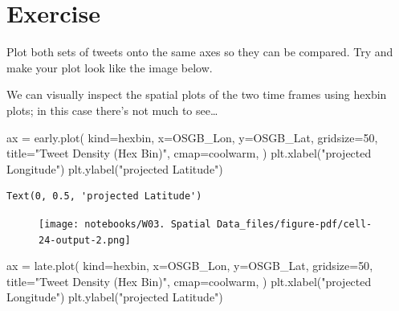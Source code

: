 \documentclass[
  letterpaper,
  DIV=11,
  numbers=noendperiod]{scrreprt}
\newenvironment{Shaded}{\begin{snugshade}}{\end{snugshade}}
\newcommand{\DecValTok}[1]{\textcolor[rgb]{0.68,0.00,0.00}{#1}}
\newcommand{\NormalTok}[1]{\textcolor[rgb]{0.00,0.23,0.31}{#1}}
\newcommand{\OperatorTok}[1]{\textcolor[rgb]{0.37,0.37,0.37}{#1}}
\newcommand{\StringTok}[1]{\textcolor[rgb]{0.13,0.47,0.30}{#1}}
\begin{document}
\hypertarget{exercise-9}{%
\section{Exercise}\label{exercise-9}}

Plot both sets of tweets onto the same axes so they can be compared. Try
and make your plot look like the image below.

We can visually inspect the spatial plots of the two time frames using
hexbin plots; in this case there's not much to see\ldots{}

\begin{Shaded}
\begin{Highlighting}[]
\NormalTok{ax }\OperatorTok{=}\NormalTok{ early.plot(}
\NormalTok{    kind}\OperatorTok{=}\StringTok{\textquotesingle{}hexbin\textquotesingle{}}\NormalTok{,}
\NormalTok{    x}\OperatorTok{=}\StringTok{\textquotesingle{}OSGB\_Lon\textquotesingle{}}\NormalTok{, }
\NormalTok{    y}\OperatorTok{=}\StringTok{\textquotesingle{}OSGB\_Lat\textquotesingle{}}\NormalTok{,}
\NormalTok{    gridsize}\OperatorTok{=}\DecValTok{50}\NormalTok{,}
\NormalTok{    title}\OperatorTok{=}\StringTok{"Tweet Density (Hex Bin)"}\NormalTok{,}
\NormalTok{    cmap}\OperatorTok{=}\StringTok{\textquotesingle{}coolwarm\textquotesingle{}}\NormalTok{,}
\NormalTok{    )}
\NormalTok{plt.xlabel(}\StringTok{"projected Longitude"}\NormalTok{)}
\NormalTok{plt.ylabel(}\StringTok{"projected Latitude"}\NormalTok{)}
\end{Highlighting}
\end{Shaded}

\begin{verbatim}
Text(0, 0.5, 'projected Latitude')
\end{verbatim}

\begin{figure}[H]

{\centering \texttt{[image: notebooks/W03. Spatial Data\_files/figure-pdf/cell-24-output-2.png]}

}

\end{figure}

\begin{Shaded}
\begin{Highlighting}[]
\NormalTok{ax }\OperatorTok{=}\NormalTok{ late.plot(}
\NormalTok{    kind}\OperatorTok{=}\StringTok{\textquotesingle{}hexbin\textquotesingle{}}\NormalTok{,}
\NormalTok{    x}\OperatorTok{=}\StringTok{\textquotesingle{}OSGB\_Lon\textquotesingle{}}\NormalTok{, }
\NormalTok{    y}\OperatorTok{=}\StringTok{\textquotesingle{}OSGB\_Lat\textquotesingle{}}\NormalTok{,}
\NormalTok{    gridsize}\OperatorTok{=}\DecValTok{50}\NormalTok{,}
\NormalTok{    title}\OperatorTok{=}\StringTok{"Tweet Density (Hex Bin)"}\NormalTok{,}
\NormalTok{    cmap}\OperatorTok{=}\StringTok{\textquotesingle{}coolwarm\textquotesingle{}}\NormalTok{,}
\NormalTok{    )}
\NormalTok{plt.xlabel(}\StringTok{"projected Longitude"}\NormalTok{)}
\NormalTok{plt.ylabel(}\StringTok{"projected Latitude"}\NormalTok{)}
\end{Highlighting}
\end{Shaded}
\end{document}
